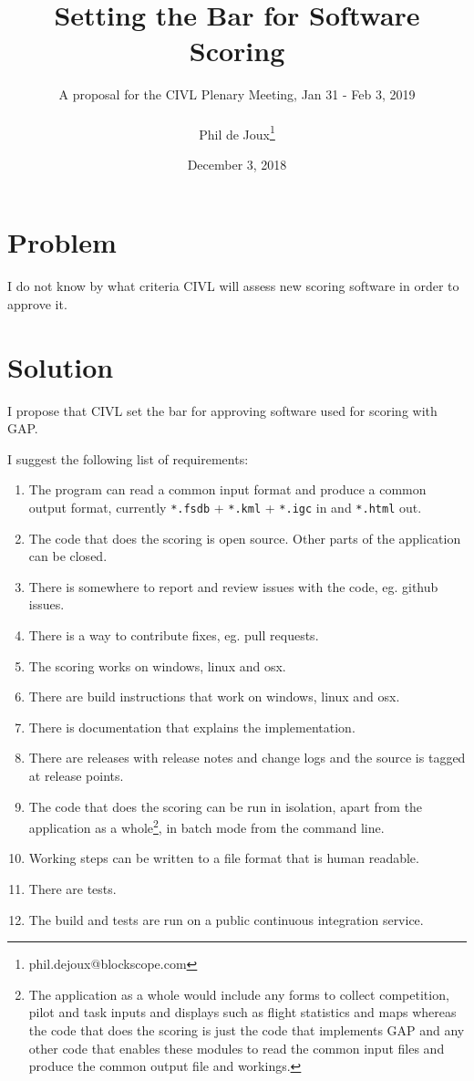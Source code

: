\documentclass{article}
\title{Setting the Bar for Software Scoring}
\date{December 3, 2018}
\author{A proposal for the CIVL Plenary Meeting, Jan 31 - Feb 3, 2019\\\\
Phil de Joux\thanks{phil.dejoux@blockscope.com}}
\begin{document}
\maketitle
\section*{Problem}
I do not know by what criteria CIVL will assess new scoring software in order
to approve it.

\section*{Solution}
I propose that CIVL set the bar for approving software used for scoring with
GAP.

I suggest the following list of requirements:\\
\begin{enumerate}
    \item The program can read a common input format and produce a common
    output format, currently \texttt{*.fsdb} + \texttt{*.kml} + \texttt{*.igc}
    in and \texttt{*.html} out.
    \item The code that does the scoring is open source. Other parts of the
    application can be closed.
    \item There is somewhere to report and review issues with the code, eg.
    github issues.
    \item There is a way to contribute fixes, eg. pull requests.
    \item The scoring works on windows, linux and osx.
    \item There are build instructions that work on windows, linux and osx.
    \item There is documentation that explains the implementation.
    \item There are releases with release notes and change logs and the source
    is tagged at release points.
    \item The code that does the scoring can be run in isolation, apart from
    the application as a whole\footnote{The application as a whole would
    include any forms to collect competition, pilot and task inputs and
    displays such as flight statistics and maps whereas the code that does the
    scoring is just the code that implements GAP and any other code that
    enables these modules to read the common input files and produce the common
    output file and workings.}, in batch mode from the command line.
    \item Working steps can be written to a file format that is human readable.
    \item There are tests.
    \item The build and tests are run on a public continuous integration service.
\end{enumerate}
\end{document}
